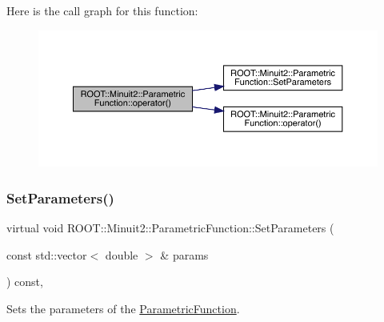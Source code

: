 Here is the call graph for this function\+:
\nopagebreak
\begin{figure}[H]
\begin{center}
\leavevmode
\includegraphics[width=350pt]{d3/d76/classROOT_1_1Minuit2_1_1ParametricFunction_a5fab6e804e0f93bd593580f582b0f7c5_cgraph}
\end{center}
\end{figure}
\mbox{\label{classROOT_1_1Minuit2_1_1ParametricFunction_a63417244db376ec27f2c85ee6432f552}} 
\subsubsection{\texorpdfstring{SetParameters()}{SetParameters()}\hspace{0.1cm}{\footnotesize\ttfamily [1/3]}}
{\footnotesize\ttfamily virtual void R\+O\+O\+T\+::\+Minuit2\+::\+Parametric\+Function\+::\+Set\+Parameters (\begin{DoxyParamCaption}\item[{const std\+::vector$<$ double $>$ \&}]{params }\end{DoxyParamCaption}) const\hspace{0.3cm}{\ttfamily [inline]}, {\ttfamily [virtual]}}

Sets the parameters of the \mbox{\hyperlink{classROOT_1_1Minuit2_1_1ParametricFunction}{Parametric\+Function}}.


